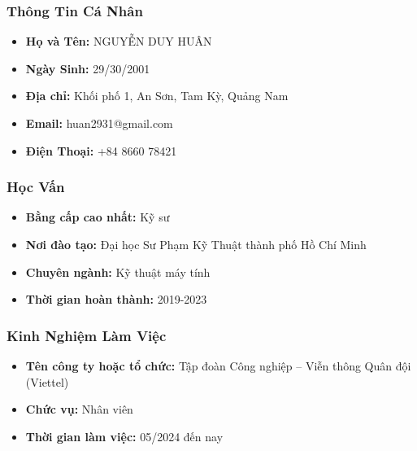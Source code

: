 \documentclass[a4paper, oneside]{book}
\begin{document}
\coverpage
\frontmatter

\begin{background}
\subsubsection*{Thông Tin Cá Nhân}

\begin{itemize}
    \footnotesize
    \item \textbf{Họ và Tên:} NGUYỄN DUY HUÂN
    \item \textbf{Ngày Sinh:} 29/30/2001
    \item \textbf{Địa chỉ:} Khối phố 1, An Sơn, Tam Kỳ, Quảng Nam
    \item \textbf{Email:} huan2931@gmail.com
    \item \textbf{Điện Thoại:} +84 8660 78421
\end{itemize}

\subsubsection*{Học Vấn}

\begin{itemize}
    \footnotesize
    \item \textbf{Bằng cấp cao nhất:} Kỹ sư
    \item \textbf{Nơi đào tạo:} Đại học Sư Phạm Kỹ Thuật thành phố Hồ Chí Minh
    \item \textbf{Chuyên ngành:} Kỹ thuật máy tính
    \item \textbf{Thời gian hoàn thành:} 2019-2023
\end{itemize}

\subsubsection*{Kinh Nghiệm Làm Việc}

\begin{itemize}
    \footnotesize
    \item \textbf{Tên công ty hoặc tổ chức:} Tập đoàn Công nghiệp – Viễn thông Quân đội (Viettel)
    \item \textbf{Chức vụ:} Nhân viên
    \item \textbf{Thời gian làm việc:} 05/2024 đến nay
\end{itemize}




\end{background}
\end{document}
